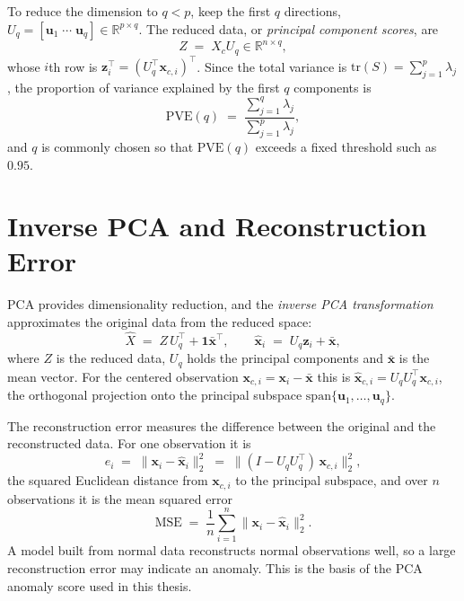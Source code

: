 \documentclass[12pt]{report}
\begin{document}
To reduce the dimension to $q < p$, keep the first $q$ directions,
$U_q = [\mathbf{u}_1\;\cdots\;\mathbf{u}_q]\in\mathbb{R}^{p\times q}$. The reduced data, or
\emph{principal component scores}, are
\begin{equation}
Z \;=\; X_c U_q \in \mathbb{R}^{n\times q},
\label{eq:projection}
\end{equation}
whose $i$th row is $\mathbf{z}_i^\top = (U_q^\top \mathbf{x}_{c,i})^\top$. Since the total variance
is $\mathrm{tr}(S) = \sum_{j=1}^p \lambda_j$, the proportion of variance explained by the first $q$
components is
\begin{equation}
\mathrm{PVE}(q) \;=\; \frac{\sum_{j=1}^{q}\lambda_j}{\sum_{j=1}^{p}\lambda_j},
\label{eq:evr}
\end{equation}
and $q$ is commonly chosen so that $\mathrm{PVE}(q)$ exceeds a fixed threshold such as $0.95$.

\section{Inverse PCA and Reconstruction Error}
PCA provides dimensionality reduction, and the \emph{inverse PCA transformation} approximates the
original data from the reduced space:
\begin{equation}
\widehat{X} \;=\; Z\,U_q^\top + \mathbf{1}\bar{\mathbf{x}}^\top,
\qquad
\widehat{\mathbf{x}}_i \;=\; U_q\mathbf{z}_i + \bar{\mathbf{x}},
\label{eq:inverse-pca}
\end{equation}
where $Z$ is the reduced data, $U_q$ holds the principal components and $\bar{\mathbf{x}}$ is the
mean vector. For the centered observation $\mathbf{x}_{c,i} = \mathbf{x}_i - \bar{\mathbf{x}}$ this
is $\widehat{\mathbf{x}}_{c,i} = U_qU_q^\top\mathbf{x}_{c,i}$, the orthogonal projection onto the
principal subspace $\mathrm{span}\{\mathbf{u}_1,\dots,\mathbf{u}_q\}$.

The reconstruction error measures the difference between the original and the reconstructed data.
For one observation it is
\begin{equation}
e_i \;=\; \|\mathbf{x}_i - \widehat{\mathbf{x}}_i\|_2^2 \;=\; \|(I - U_qU_q^\top)\,\mathbf{x}_{c,i}\|_2^2 ,
\label{eq:recon-error}
\end{equation}
the squared Euclidean distance from $\mathbf{x}_{c,i}$ to the principal subspace, and over $n$
observations it is the mean squared error
\begin{equation}
\mathrm{MSE} \;=\; \frac{1}{n}\sum_{i=1}^{n} \|\mathbf{x}_i - \widehat{\mathbf{x}}_i\|_2^2 .
\label{eq:mse}
\end{equation}
A model built from normal data reconstructs normal observations well, so a large reconstruction
error may indicate an anomaly. This is the basis of the PCA anomaly score used in this thesis.
\end{document}
